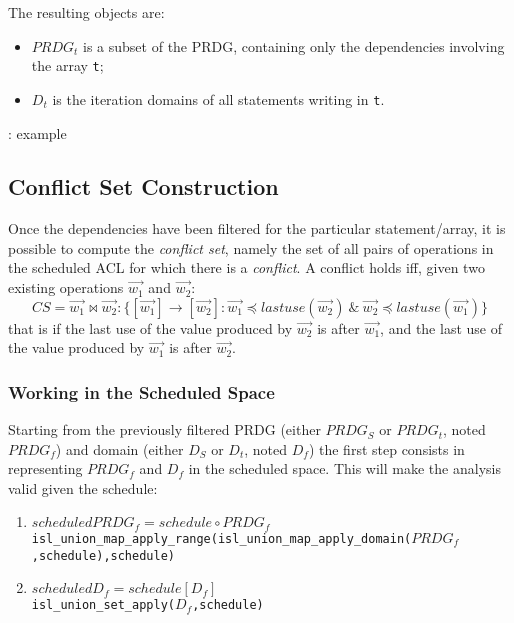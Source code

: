 \documentclass{article}
\newcommand{\TODO}[0]{\textbf{\color{red}{TODO}}}
\begin{document}
The resulting objects are:
\begin{itemize}
  \item $PRDG_t$ is a subset of the PRDG, containing only the dependencies
  involving the array {\tt t};
  \item $D_t$ is the iteration domains of all statements writing in {\tt t}.
\end{itemize}

\TODO : example

\subsection{Conflict Set Construction}

Once the dependencies have been filtered for the particular statement/array, it
is possible to compute the \emph{conflict set},
namely the set of all pairs of operations in the scheduled ACL for which there
is a \emph{conflict}. A conflict holds iff, given two existing operations
$\vec{w_1}$ and $\vec{w_2}$:
$$CS = \vec{w_1} \bowtie \vec{w_2} : \{ [\vec{w_1}] \rightarrow [\vec{w_2}] :
\vec{w_1} \preceq lastuse(\vec{w_2})~\&~\vec{w_2} \preceq lastuse(\vec{w_1})
\}$$ that is if the last use of the value produced by $\vec{w_2}$ is after
$\vec{w_1}$, and the last use of the value produced by $\vec{w_1}$ is after
$\vec{w_2}$.

\subsubsection{Working in the Scheduled Space}
Starting from the previously filtered PRDG (either $PRDG_S$ or $PRDG_t$, noted
$PRDG_f$) and domain (either $D_S$ or $D_t$, noted $D_f$) the first step
consists in representing $PRDG_f$ and $D_f$ %
in the scheduled space. This will make the analysis valid given the schedule:
\begin{enumerate}
\item $scheduledPRDG_f = schedule \circ PRDG_f$\\
{\tt isl\_union\_map\_apply\_range(isl\_union\_map\_apply\_domain($PRDG_f$,schedule),schedule)}
\item $scheduledD_f = schedule[D_f]$\\
{\tt isl\_union\_set\_apply($D_f$,schedule)}
\end{enumerate}
\end{document}
